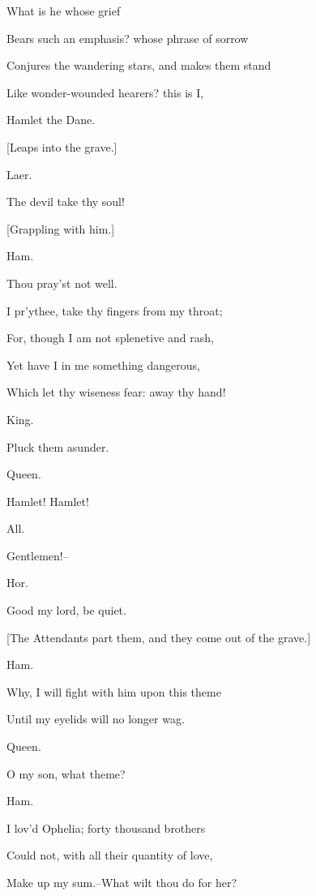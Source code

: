 \documentclass[12pt]{book}
\begin{document}
What is he whose grief

Bears such an emphasis? whose phrase of sorrow

Conjures the wandering stars, and makes them stand

Like wonder-wounded hearers? this is I,

Hamlet the Dane.

[Leaps into the grave.]



Laer.

The devil take thy soul!

[Grappling with him.]



Ham.

Thou pray'st not well.

I pr'ythee, take thy fingers from my throat;

For, though I am not splenetive and rash,

Yet have I in me something dangerous,

Which let thy wiseness fear: away thy hand!



King.

Pluck them asunder.



Queen.

Hamlet! Hamlet!



All.

Gentlemen!--



Hor.

Good my lord, be quiet.



[The Attendants part them, and they come out of the grave.]



Ham.

Why, I will fight with him upon this theme

Until my eyelids will no longer wag.



Queen.

O my son, what theme?



Ham.

I lov'd Ophelia; forty thousand brothers

Could not, with all their quantity of love,

Make up my sum.--What wilt thou do for her?
\end{document}
